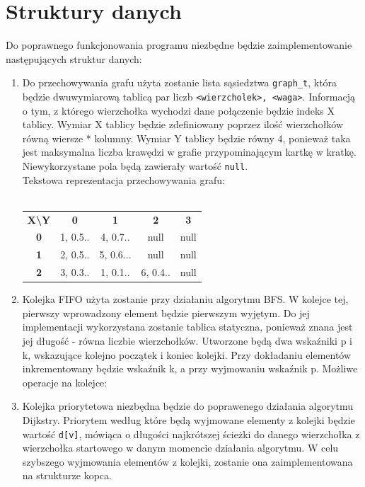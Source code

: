 \documentclass{article}
\begin{document}
\section{Struktury danych}
Do poprawnego funkcjonowania programu niezbędne będzie zaimplementowanie następujących struktur danych:\\
\begin{enumerate}
\item Do przechowywania grafu użyta zostanie lista sąsiedztwa \texttt{graph\_t}, która będzie dwuwymiarową tablicą par liczb \texttt{\footnotesize <wierzcholek>, <waga>}. Informacją o tym, z którego wierzchołka wychodzi dane połączenie będzie indeks X tablicy. Wymiar X tablicy będzie zdefiniowany poprzez ilość wierzchołków równą wiersze * kolumny. Wymiar Y tablicy będzie równy 4, ponieważ taka jest maksymalna liczba krawędzi w grafie przypominającym kartkę w kratkę. Niewykorzystane pola będą zawierały wartość \texttt{\footnotesize null}.\\
Tekstowa reprezentacja przechowywania grafu:\\\\
\begin{tabular}{ccccc}
\textbf{X\textbackslash{}Y} & \textbf{0} & \textbf{1} & \textbf{2} & \textbf{3} \\
\textbf{0}                  & 1, 0.5..          & 4, 0.7..         & null       & null       \\
\textbf{1}                  & 2, 0.5..     &  5, 0.6...     & null       & null       \\
\textbf{2}                  & 3, 0.3..          & 1, 0.1..          & 6, 0.4..         & null      \\
\end{tabular}
\item Kolejka FIFO użyta zostanie przy działaniu algorytmu BFS. W kolejce tej, pierwszy wprowadzony element będzie pierwszym wyjętym. Do jej implementacji wykorzystana zostanie tablica statyczna, ponieważ znana jest jej długość - równa liczbie wierzchołków. Utworzone będą dwa wskaźniki p i k,  wskazujące kolejno początek i koniec kolejki. Przy dokładaniu elementów inkrementowany będzie wskaźnik k, a przy wyjmowaniu wskaźnik p. Możliwe operacje na kolejce:

\item Kolejka priorytetowa niezbędna będzie do poprawenego działania algorytmu Dijkstry. Priorytem według które będą wyjmowane elementy z kolejki będzie wartość \texttt{d[v]}, mówiąca o długości najkrótszej ścieżki do danego wierzchołka z wierzchołka startowego w danym momencie działania algorytmu. W celu szybszego wyjmowania elementów z kolejki, zostanie ona zaimplementowana na strukturze kopca.
\end{enumerate}
\end{document}
